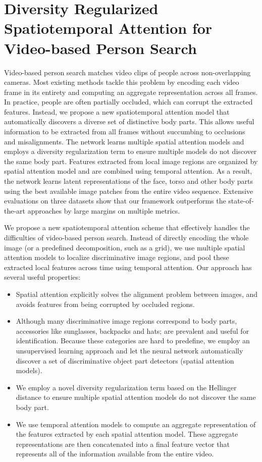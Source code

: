 \chapter{Diversity Regularized Spatiotemporal Attention for Video-based Person Search}
\label{ch:person-reid}

Video-based person search matches video clips of people across non-overlapping cameras. Most existing methods tackle this problem by encoding each video frame in its entirety and computing an aggregate representation across all frames. In practice, people are often partially occluded, which can corrupt the extracted features. Instead, we propose a new spatiotemporal attention model that automatically discovers a diverse set of distinctive body parts.  This allows useful information to be extracted from all frames without succumbing to occlusions and misalignments. The network learns multiple spatial attention models and employs a diversity regularization term to ensure multiple models do not discover the same body part.  Features extracted from local image regions are organized by spatial attention model and are combined using temporal attention. As a result, the network learns latent representations of the face, torso and other body parts using the best available image patches from the entire video sequence. Extensive evaluations on three datasets show that our framework outperforms the state-of-the-art approaches by large margins on multiple metrics.

We propose a new spatiotemporal attention scheme that effectively handles the difficulties of video-based person search.  Instead of directly encoding the whole image (or a predefined decomposition, such as a grid), we use multiple spatial attention models to localize discriminative image regions, and pool these extracted local features across time using temporal attention. Our approach has several useful properties:
\begin{itemize}
    \item Spatial attention explicitly solves the alignment problem between images, and avoids features from being corrupted by occluded regions. 
    \item Although many discriminative image regions correspond to body parts, accessories like sunglasses, backpacks and hats; are prevalent and useful for identification.  Because these categories are hard to predefine, we employ an unsupervised learning approach and let the neural network automatically discover a set of discriminative object part detectors (spatial attention models). 
    \item We employ a novel diversity regularization term based on the Hellinger distance to ensure multiple spatial attention models do not discover the same body part.
    \item We use temporal attention models to compute an aggregate representation of the features extracted by each spatial attention model. These aggregate representations are then concatenated into a final feature vector that represents all of the information available from the entire video.
\end{itemize}




